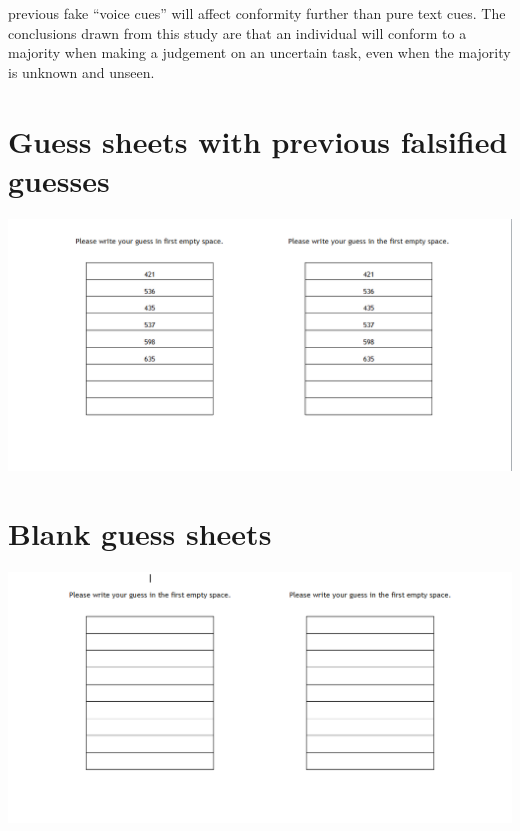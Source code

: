\documentclass{report}
\begin{document}
previous fake “voice cues” will affect conformity further than pure text cues. The conclusions drawn from this study are that an individual will conform to a majority when making a judgement on an uncertain task, even when the majority is unknown and unseen.
\appendix
\appendixpage
\addappheadtotoc
\chapter{Guess sheets with previous falsified guesses}
\includegraphics[width=\textwidth]{psych1}
\chapter{Blank guess sheets}
\includegraphics[width=\textwidth]{psych2}
\end{document}
